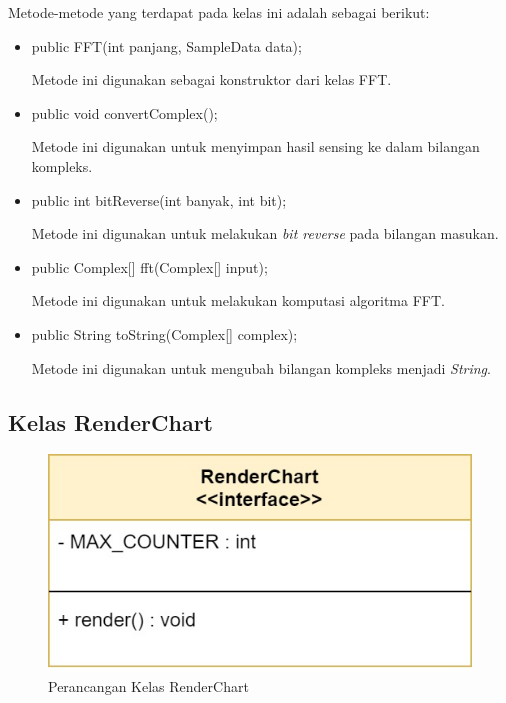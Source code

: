 Metode-metode yang terdapat pada kelas ini adalah sebagai berikut:
\begin{itemize}
    \item public FFT(int panjang, SampleData data);
    
    Metode ini digunakan sebagai konstruktor dari kelas FFT.
    
    \item public void convertComplex();
    
    Metode ini digunakan untuk menyimpan hasil sensing ke dalam bilangan kompleks.
    
    \item public int bitReverse(int banyak, int bit);
    
    Metode ini digunakan untuk melakukan \textit{bit reverse} pada bilangan masukan.
    
    \item public Complex[] fft(Complex[] input);
    
    Metode ini digunakan untuk melakukan komputasi algoritma FFT.
    
    \item public String toString(Complex[] complex);
    
    Metode ini digunakan untuk mengubah bilangan kompleks menjadi \textit{String}.
\end{itemize}


\subsection{Kelas RenderChart}
\begin{figure}[H] 
	\centering  
	\includegraphics[scale=0.35]{Gambar/Controller Package/Controller-RenderChart.jpg}
	\caption[Perancangan Kelas RenderChart]{Perancangan Kelas RenderChart}
	\label{fig:controller_startChart} 
\end{figure}

